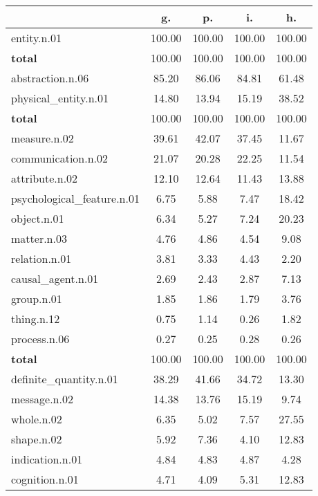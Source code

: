 \begin{table}[h!]
\begin{center}
\begin{tabular}{| l || c | c | c | c |}\hline
 & {\bf g.} & {\bf p.} & {\bf i.} & {\bf h.} \\\hline\hline
entity.n.01 & 100.00  & 100.00  & 100.00  & 100.00 \\\hline\hline
{{\bf total}} & 100.00  & 100.00  & 100.00  & 100.00 \\\hline\hline\hline
abstraction.n.06 & 85.20  & 86.06  & 84.81  & 61.48 \\\hline
physical\_entity.n.01 & 14.80  & 13.94  & 15.19  & 38.52 \\\hline\hline
{{\bf total}} & 100.00  & 100.00  & 100.00  & 100.00 \\\hline\hline\hline
measure.n.02 & 39.61  & 42.07  & 37.45  & 11.67 \\\hline
communication.n.02 & 21.07  & 20.28  & 22.25  & 11.54 \\\hline
attribute.n.02 & 12.10  & 12.64  & 11.43  & 13.88 \\\hline
psychological\_feature.n.01 & 6.75  & 5.88  & 7.47  & 18.42 \\\hline
object.n.01 & 6.34  & 5.27  & 7.24  & 20.23 \\\hline
matter.n.03 & 4.76  & 4.86  & 4.54  & 9.08 \\\hline
relation.n.01 & 3.81  & 3.33  & 4.43  & 2.20 \\\hline
causal\_agent.n.01 & 2.69  & 2.43  & 2.87  & 7.13 \\\hline
group.n.01 & 1.85  & 1.86  & 1.79  & 3.76 \\\hline
thing.n.12 & 0.75  & 1.14  & 0.26  & 1.82 \\\hline
process.n.06 & 0.27  & 0.25  & 0.28  & 0.26 \\\hline\hline
{{\bf total}} & 100.00  & 100.00  & 100.00  & 100.00 \\\hline\hline\hline
definite\_quantity.n.01 & 38.29  & 41.66  & 34.72  & 13.30 \\\hline
message.n.02 & 14.38  & 13.76  & 15.19  & 9.74 \\\hline
whole.n.02 & 6.35  & 5.02  & 7.57  & 27.55 \\\hline
shape.n.02 & 5.92  & 7.36  & 4.10  & 12.83 \\\hline
indication.n.01 & 4.84  & 4.83  & 4.87  & 4.28 \\\hline
cognition.n.01 & 4.71  & 4.09  & 5.31  & 12.83 \\\hline

\end{tabular}
\end{center}
\end{table}

